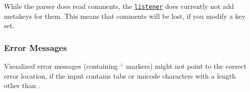 While the parser does read comments, the \href{/home/markus/Projekte/Elektra/current/src/plugins/yaypeg/listener.cpp}{\tt listener} does currently not add metakeys for them. This means that comments will be lost, if you modify a key set.

\subsubsection*{Error Messages}

Visualized error messages (containing {\ttfamily $^\wedge$} markers) might not point to the correct error location, if the input contains tabs or unicode characters with a length other than {}. 